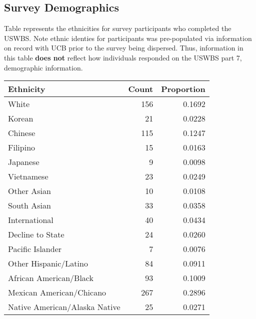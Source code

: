 \documentclass{article}\usepackage[]{graphicx}\usepackage[]{color}
\begin{document}
\newpage

\subsection{Survey Demographics}
Table represents the ethnicities for survey participants who completed the USWBS. Note  ethnic identies for participants was pre-populated via information on record with UCB prior to the survey being dispersed. Thus, information in this table \textbf{does not} reflect how individuals responded on the USWBS part 7, demographic information.
\begin{table}[ht]
\centering
\begin{tabular}{lrr}
  \hline
Ethnicity & Count & Proportion \\ 
  \hline
                         White & 156 & 0.1692 \\ 
                          Korean & 21 & 0.0228 \\ 
                         Chinese & 115 & 0.1247 \\ 
                        Filipino & 15 & 0.0163 \\ 
                        Japanese & 9 & 0.0098 \\ 
                      Vietnamese & 23 & 0.0249 \\ 
                     Other Asian & 10 & 0.0108 \\ 
                     South Asian & 33 & 0.0358 \\ 
                   International & 40 & 0.0434 \\ 
                Decline to State & 24 & 0.0260 \\ 
                Pacific Islander & 7 & 0.0076 \\ 
           Other Hispanic/Latino & 84 & 0.0911 \\ 
          African American/Black & 93 & 0.1009 \\ 
        Mexican American/Chicano & 267 & 0.2896 \\ 
   Native American/Alaska Native & 25 & 0.0271 \\ 
   \hline
\end{tabular}
\end{table}
\end{document}
